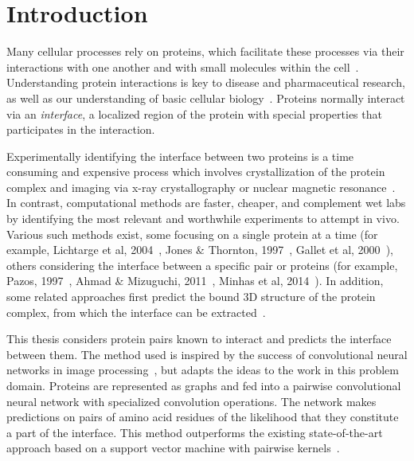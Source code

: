 

\chapter{Introduction}
\label{chap:intro}

Many cellular processes rely on proteins, which facilitate these processes via their interactions with one another and with small molecules within the cell~\cite{scheeffink2003}.
Understanding protein interactions is key to disease and pharmaceutical research, as well as our understanding of basic cellular biology~\cite{fauman2003, altman2003}.
Proteins normally interact via an \textit{interface}, a localized region of the protein with special properties that participates in the interaction.

Experimentally identifying the interface between two proteins is a time consuming and expensive process which involves crystallization of the protein complex and imaging via x-ray crystallography or nuclear magnetic resonance~\cite{bijelic2017, ilarisavino2017, wang2017}.
In contrast, computational methods are faster, cheaper, and complement wet labs by identifying the most relevant and worthwhile experiments to attempt in vivo.
Various such methods exist, some focusing on a single protein at a time (for example, Lichtarge et al, 2004~\cite{lichtarge1996}, Jones \& Thornton, 1997~\cite{jones1997}, Gallet et al, 2000~\cite{gallet2000}), others considering the interface between a specific pair or proteins (for example, Pazos, 1997~\cite{pazos1997}, Ahmad \& Mizuguchi, 2011~\cite{ahmad2011}, Minhas et al, 2014~\cite{minhas2014}).
In addition, some related approaches first predict the bound 3D structure of the protein complex, from which the interface can be extracted~\cite{janin1995, chen2003, dominguez2003}.

This thesis considers protein pairs known to interact and predicts the interface between them.
The method used is inspired by the success of convolutional neural networks in image processing~\cite{gu2015, lecun2010}, but adapts the ideas to the work in this problem domain.
Proteins are represented as graphs and fed into a pairwise convolutional neural network with specialized convolution operations.
The network makes predictions on pairs of amino acid residues of the likelihood that they constitute a part of the interface. 
This method outperforms the existing state-of-the-art approach based on a support vector machine with pairwise kernels~\cite{minhas2014}.

